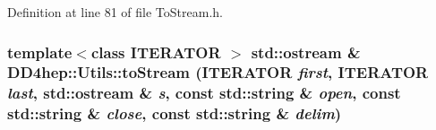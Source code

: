 Definition at line 81 of file ToStream.h.\hypertarget{namespace_d_d4hep_1_1_utils_a9e8a16588de4a1111974c06684574814}{
\subsubsection[{toStream}]{\setlength{\rightskip}{0pt plus 5cm}template$<$class ITERATOR $>$ std::ostream \& DD4hep::Utils::toStream (ITERATOR {\em first}, \/  ITERATOR {\em last}, \/  std::ostream \& {\em s}, \/  const std::string \& {\em open}, \/  const std::string \& {\em close}, \/  const std::string \& {\em delim})}}
\label{namespace_d_d4hep_1_1_utils_a9e8a16588de4a1111974c06684574814}


